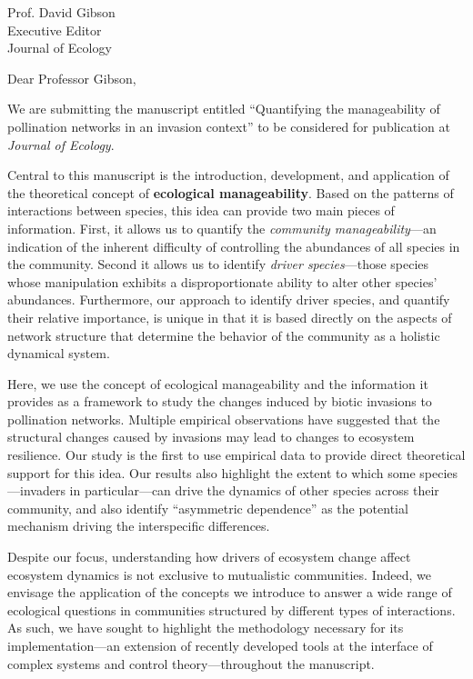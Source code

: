 \documentclass[12pt]{letter}
\begin{document}
\begin{letter}{
       Prof. David Gibson\\
       Executive Editor\\
       Journal of Ecology}

\opening{Dear Professor Gibson,}

We are submitting the manuscript entitled ``Quantifying the manageability of pollination networks in an invasion context'' to be considered for publication at \emph{Journal of Ecology}. 

Central to this manuscript is the introduction, development, and application of the theoretical concept of \textbf{ecological manageability}.
Based on the patterns of interactions between species, this idea can provide two main pieces of information. 
First, it allows us to quantify the \textit{community manageability}---an indication of the inherent difficulty of controlling the abundances of all species in the community. 
Second it allows us to identify \textit{driver species}---those species whose manipulation exhibits a disproportionate ability to alter other species' abundances. 
Furthermore, our approach to identify driver species, and quantify their relative importance, is unique in that it is based directly on the aspects of network structure that determine the behavior of the community as a holistic dynamical system. 

Here, we use the concept of ecological manageability and the information it provides as a framework to study the changes induced by biotic invasions to pollination networks. 
Multiple empirical observations have suggested that the structural changes caused by invasions may lead to changes to ecosystem resilience. 
Our study is the first to use empirical data to provide direct theoretical support for this idea. 
Our results also highlight the extent to which some species---invaders in particular---can drive the dynamics of other species across their community, and also identify ``asymmetric dependence'' as the potential mechanism driving the interspecific differences.

Despite our focus, understanding how drivers of ecosystem change affect ecosystem dynamics is not exclusive to mutualistic communities. 
Indeed, we envisage the application of the concepts we introduce to answer a wide range of ecological questions in communities structured by different types of interactions.
As such, we have sought to highlight the methodology necessary for its implementation---an extension of recently developed tools at the interface of complex systems and control theory---throughout the manuscript. 


\end{letter}
\end{document}
